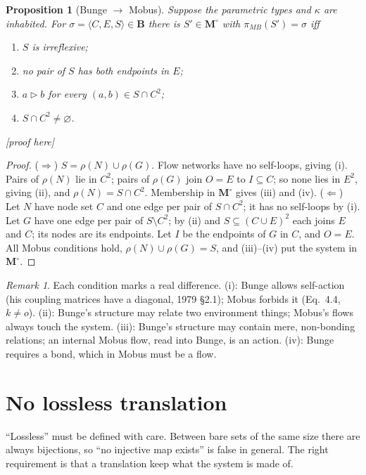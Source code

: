 \documentclass[11pt]{article}
\newtheorem{proposition}[theorem]{Proposition}
\theoremstyle{definition}
\theoremstyle{remark}
\newtheorem{remark}[theorem]{Remark}
\newcommand{\B}{\mathbf{B}}
\newcommand{\Mo}{\mathbf{M}^{\circ}}
\newcommand{\acts}{\mathrel{\triangleright}}
\newcommand{\status}[1]{\hfill\textsf{\small[#1]}}
\newcommand{\pMB}{\pi_{MB}}
\begin{document}
\begin{proposition}[Bunge $\to$ Mobus]\label{prop:BM}
Suppose the parametric types and $\kappa$ are inhabited. For $\sigma=\langle C,E,S\rangle\in\B$ there is $S'\in\Mo$ with $\pMB(S')=\sigma$ iff
\begin{enumerate}[label=(\roman*),nosep]
\item $S$ is irreflexive;
\item no pair of $S$ has both endpoints in $E$;
\item $a\acts b$ for every $(a,b)\in S\cap C^2$;
\item $S\cap C^2\neq\varnothing$.
\end{enumerate}\status{proof here}
\end{proposition}
\begin{proof}
($\Rightarrow$) $S=\rho(N)\cup\rho(G)$. Flow networks have no self-loops, giving (i). Pairs of $\rho(N)$ lie in $C^2$; pairs of $\rho(G)$ join $O=E$ to $I\subseteq C$; so none lies in $E^2$, giving (ii), and $\rho(N)=S\cap C^2$. Membership in $\Mo$ gives (iii) and (iv).
($\Leftarrow$) Let $N$ have node set $C$ and one edge per pair of $S\cap C^2$; it has no self-loops by (i). Let $G$ have one edge per pair of $S\setminus C^2$; by (ii) and $S\subseteq(C\cup E)^2$ each joins $E$ and $C$; its nodes are its endpoints. Let $I$ be the endpoints of $G$ in $C$, and $O=E$. All Mobus conditions hold, $\rho(N)\cup\rho(G)=S$, and (iii)--(iv) put the system in $\Mo$.
\end{proof}

\begin{remark}
Each condition marks a real difference. (i): Bunge allows self-action (his coupling matrices have a diagonal, 1979 \S2.1); Mobus forbids it (Eq.~4.4, $k\neq o$). (ii): Bunge's structure may relate two environment things; Mobus's flows always touch the system. (iii): Bunge's structure may contain mere, non-bonding relations; an internal Mobus flow, read into Bunge, is an action. (iv): Bunge requires a bond, which in Mobus must be a flow.
\end{remark}

\section{No lossless translation}\label{sec:lossless}

``Lossless'' must be defined with care. Between bare sets of the same size there are always bijections, so ``no injective map exists'' is false in general. The right requirement is that a translation keep what the system is made of.
\end{document}
